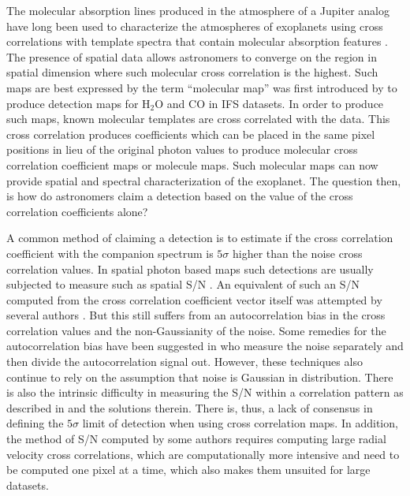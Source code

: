 \documentclass{aa}
\begin{document}
The molecular absorption lines produced in the atmosphere of a Jupiter analog have long been used to characterize the atmospheres of exoplanets using cross correlations with template spectra \cite[e.g][]{birkby2013detection,snellen2010orbital} that contain molecular absorption features \citep[e.g][]{2003BTsettl}.
The presence of spatial data allows astronomers to converge on the region in spatial dimension where such molecular cross correlation is the highest.
Such maps are best expressed by the term ``molecular map'' was first introduced by \citet{2018AHoeijmakersMM} to produce detection maps for \rm{H$_2$O} and \rm{CO} in IFS datasets.
In order to produce such maps, known molecular templates are cross correlated with the data.
This cross correlation produces coefficients which can be placed in the same pixel positions in lieu of the original photon values to produce molecular cross correlation coefficient maps or molecule maps.
Such molecular maps can now provide spatial and spectral characterization of the exoplanet.
The question then, is how do astronomers claim a detection based on the value of the cross correlation coefficients alone?

A common method of claiming a detection is to estimate if the cross correlation coefficient with the companion spectrum is $5\sigma$ higher than the noise cross correlation values.
In spatial photon based maps such detections are usually subjected to measure such as spatial S/N \citep[][]{2014MawetSNR}.
An equivalent of such an S/N computed from the cross correlation coefficient vector itself was attempted by several authors \citep[e.g., ][]{2018AHoeijmakersMM}.
But this still suffers from an autocorrelation bias in the cross correlation values and the non-Gaussianity of the noise.
Some remedies for the autocorrelation bias have been suggested in \citet[][]{ruffio2019radial} who measure the noise separately and then divide the autocorrelation signal out.
However, these techniques also continue to rely on the assumption that noise is Gaussian in distribution.
There is also the intrinsic difficulty in measuring the S/N within a correlation pattern as described in \cite{2023Malin} and the solutions therein. There is, thus, a lack of consensus in defining the $5\sigma$ limit of detection when using cross correlation maps.
In addition, the method of S/N computed by some authors \citep[e.g in][]{2021Cugno} requires computing large radial velocity cross correlations, which are computationally more intensive and need to be computed one pixel at a time, which also makes them unsuited for large datasets.
\end{document}
